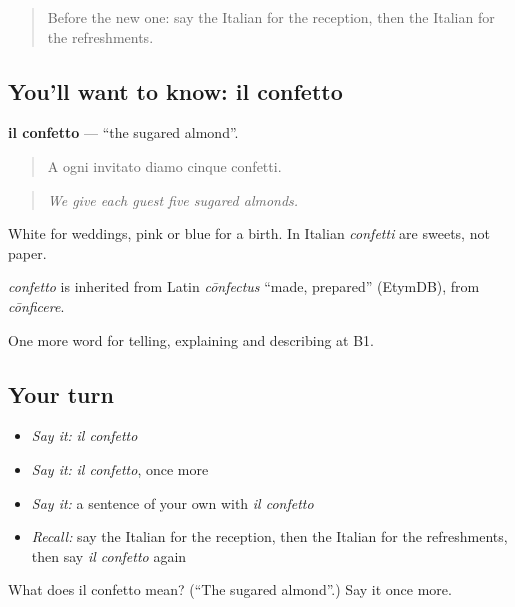 \label{lesson:IT-C318-confetto}



\begin{quote}
Before the new one: say the Italian for the reception, then the Italian for the refreshments.
\end{quote}

\subsection*{You'll want to know: il confetto}
\textbf{il confetto} — \textquotedblleft{}the sugared almond\textquotedblright{}.

\begin{quote}
A ogni invitato diamo cinque confetti.
\end{quote}

\begin{quote}
\emph{We give each guest five sugared almonds.}
\end{quote}

White for weddings, pink or blue for a birth. In Italian \emph{confetti} are sweets, not paper.

\begin{cousinweb}
\emph{confetto} is inherited from Latin \emph{cōnfectus} \textquotedblleft{}made, prepared\textquotedblright{} (EtymDB), from \emph{cōnficere}.
\end{cousinweb}

\begin{grammarlens}[title={What you've built}]
One more word for telling, explaining and describing at B1.
\end{grammarlens}

\subsection*{Your turn}
\begin{itemize}
\raggedright
  \item \emph{Say it:} \emph{il confetto}
  \item \emph{Say it:} \emph{il confetto}, once more
  \item \emph{Say it:} a sentence of your own with \emph{il confetto}
  \item \emph{Recall:} say the Italian for the reception, then the Italian for the refreshments, then say \emph{il confetto} again
\end{itemize}

\begin{tcolorbox}[breakable,colback=teal!4,colframe=teal!35!black,title={Before you move on}]
What does il confetto mean? (\textquotedblleft{}The sugared almond\textquotedblright{}.) Say it once more.
\end{tcolorbox}
